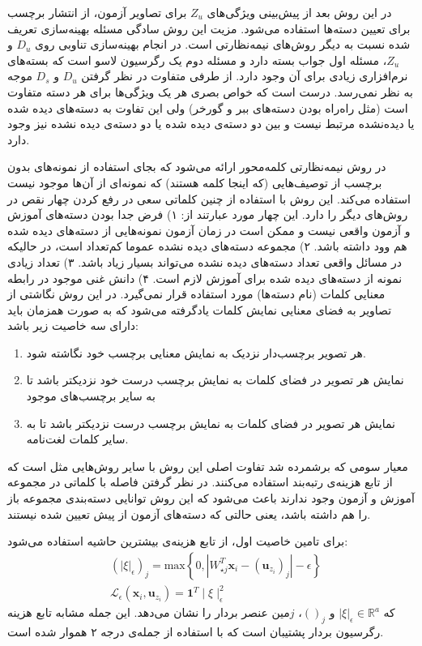 در این روش بعد از پیش‌بینی ویژگی‌های $Z_u$ برای تصاویر آزمون، از انتشار برچسب برای تعیین دسته‌ها استفاده می‌شود. مزیت این روش سادگی مسئله بهینه‌سازی تعریف شده نسبت به دیگر روش‌های نیمه‌نظارتی است. در انجام بهینه‌سازی تناوبی روی $D_u$ و $Z_u$، مسئله اول جواب بسته دارد و مسئله دوم یک رگرسیون لاسو است که بسته‌های نرم‌افزاری زیادی برای آن وجود دارد. از طرفی متفاوت در نظر گرفتن $D_u$ و $D_s$ موجه به نظر نمی‌رسد. درست است که خواص بصری هر یک ویژگی‌ها برای هر دسته متفاوت است (مثل راه‌راه  بودن دسته‌های ببر و گورخر) ولی این تفاوت به دسته‌های دیده شده یا دیده‌نشده مرتبط نیست و بین دو دسته‌ی دیده شده یا دو دسته‌ی دیده نشده نیز وجود دارد.

در \cite{Fu2016} روش نیمه‌نظارتی کلمه‌محور   ارائه می‌شود که بجای استفاده از نمونه‌های بدون برچسب از توصیف‌هایی (که اینجا کلمه هستند) که نمونه‌ای از آن‌ها موجود نیست استفاده می‌کند. این روش با استفاده از چنین کلماتی سعی در رفع کردن چهار نقص در روش‌های دیگر را دارد. این چهار مورد عبارتند از: ۱) فرض جدا بودن دسته‌های آموزش و آزمون واقعی نیست و ممکن است در زمان آزمون نمونه‌هایی از دسته‌های دیده شده هم وود داشته باشد. ۲) مجموعه دسته‌های دیده نشده عموما کم‌تعداد است، در حالیکه در مسائل واقعی تعداد دسته‌های دیده نشده می‌تواند بسیار زیاد باشد. ۳) تعداد زیادی نمونه از دسته‌های دیده شده برای آموزش لازم است. ۴) دانش غنی موجود در رابطه معنایی کلمات (نام دسته‌ها) مورد استفاده قرار نمی‌گیرد. 
در این روش نگاشتی از تصاویر به فضای معنایی نمایش کلمات یادگرفته می‌شود که به صورت همزمان باید دارای سه خاصیت زیر باشد:
\begin{enumerate}
\item هر تصویر برچسب‌دار نزدیک به نمایش معنایی برچسب خود نگاشته شود.
\item 
نمایش هر تصویر در فضای کلمات به نمایش برچسب درست خود نزدیکتر باشد تا به سایر برچسب‌های موجود
\item 
نمایش هر تصویر در فضای کلمات به نمایش برچسب درست نزدیکتر باشد تا به سایر کلمات لغت‌نامه.
\end{enumerate}
معیار سومی که برشمرده شد تفاوت اصلی این روش با سایر روش‌هایی مثل
\cite{devise}
است که از تابع هزینه‌ی رتبه‌بند استفاده می‌کنند. در نظر گرفتن فاصله با کلماتی در مجموعه آموزش و آزمون وجود ندارند باعث می‌شود که این روش توانایی دسته‌بندی مجموعه باز 
 را هم داشته باشد، یعنی حالتی که دسته‌های آزمون از پیش تعیین شده نیستند.
  
 برای تامین خاصیت اول، از تابع هزینه‌ی بیشترین حاشیه استفاده می‌شود:
\begin{align}
\label{eq:svr}
&\left(|\xi|_{\epsilon}\right)_{j} =\mathrm{max}\left\{ 0,|W_{\star j}^{T}\mathbf{x}_{i}-\left(\mathbf{\mathbf{u}}_{z_{i}}\right)_{j}|-\epsilon\right\} \\
&\mathcal{L}_{\epsilon}\left(\mathbf{x}_{i},\mathbf{u}_{z_{i}}\right) =\mathbf{1}^{T}\mid\xi\mid_{\epsilon}^{2} 
\end{align}
که
 $|\xi|_{\epsilon}\in\mathbb{R}^{a}$
و 
$()_j$،
$j$مین 
عنصر بردار را نشان می‌دهد. این جمله  مشابه تابع هزینه رگرسیون بردار پشتیبان 
  است که با استفاده از جمله‌ی درجه ۲ هموار شده است.
  
